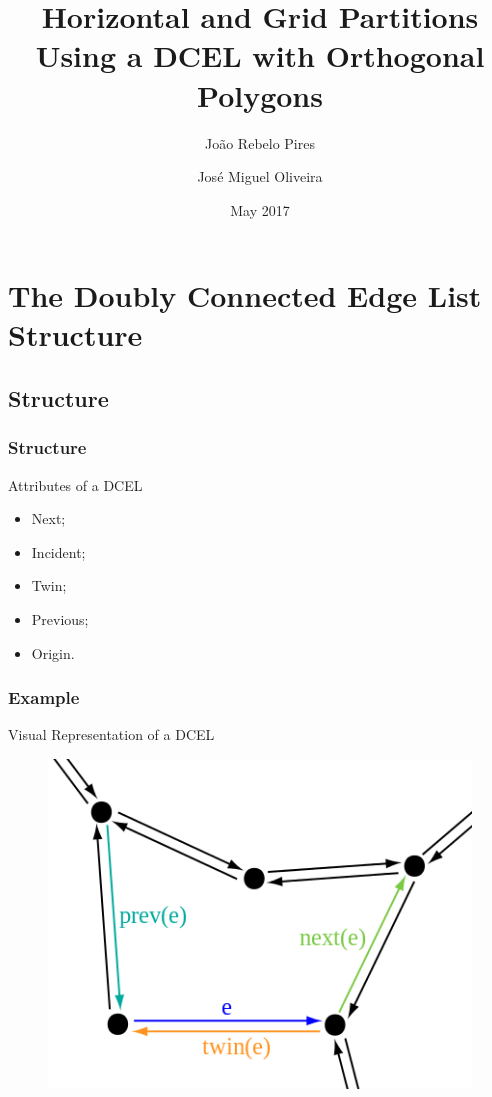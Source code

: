 \documentclass{beamer}
\title[Horizontal and Grid Partitions]{Horizontal and Grid Partitions\\Using a DCEL with Orthogonal Polygons}
\author[João Pires, José Oliveira, DCC/FCUP]{João Rebelo Pires \and José Miguel Oliveira}
\institute[DCC/FCUP]{Departamento de Ciência de Computadores, FCUP}
\date{May 2017}
\begin{document}
\begin{frame}
\maketitle
\end{frame}

\section{The Doubly Connected Edge List Structure}
\subsection{Structure}
\begin{frame}
\frametitle{Structure}
\begin{block}{Attributes of a DCEL}
\begin{itemize}[<+->]
	\item Next;
	\item Incident;
	\item Twin;
	\item Previous;
	\item Origin.
\end{itemize}	
\end{block}
\end{frame}

\begin{frame}
\frametitle{Example}
\begin{block}{Visual Representation of a DCEL}
	\begin{figure}
		\includegraphics[scale=0.5]{images/dcel}
	\end{figure}
\end{block}

\end{frame}
\end{document}
